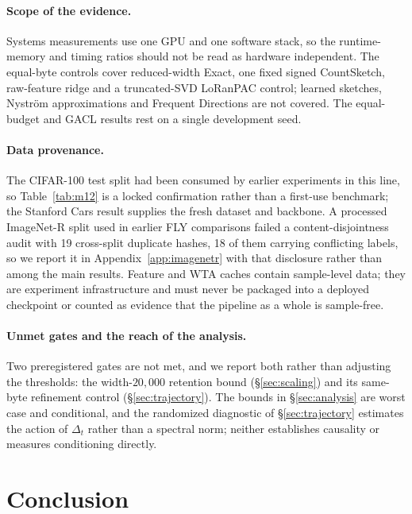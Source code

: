 \documentclass{article}
\begin{document}
\paragraph{Scope of the evidence.}
Systems measurements use one GPU and one software stack, so the runtime-memory
and timing ratios should not be read as hardware independent. The equal-byte
controls cover reduced-width Exact, one fixed signed CountSketch, raw-feature
ridge and a truncated-SVD LoRanPAC control; learned sketches, Nystr\"om
approximations and Frequent Directions
\citep{ghashami2016,streamingridge2020} are not covered. The equal-budget and
GACL results rest on a single development seed.

\paragraph{Data provenance.}
The CIFAR-100 test split had been consumed by earlier experiments in this line,
so Table~\ref{tab:m12} is a locked confirmation rather than a first-use
benchmark; the Stanford Cars result supplies the fresh dataset and backbone. A
processed ImageNet-R split used in earlier FLY comparisons failed a
content-disjointness audit with 19 cross-split duplicate hashes, 18 of them
carrying conflicting labels, so we report it in Appendix~\ref{app:imagenetr}
with that disclosure rather than among the main results. Feature and WTA caches
contain sample-level data; they are experiment infrastructure and must never be
packaged into a deployed checkpoint or counted as evidence that the pipeline as
a whole is sample-free.

\paragraph{Unmet gates and the reach of the analysis.}
Two preregistered gates are not met, and we report both rather than adjusting
the thresholds: the width-$20{,}000$ retention bound (\S\ref{sec:scaling}) and
its same-byte refinement control (\S\ref{sec:trajectory}). The bounds in
\S\ref{sec:analysis} are worst case and conditional, and the randomized
diagnostic of \S\ref{sec:trajectory} estimates the action of $\Delta_t$ rather
than a spectral norm; neither establishes causality or measures conditioning
directly.

\section{Conclusion}
\end{document}
